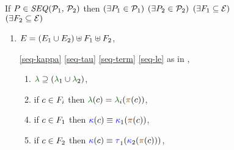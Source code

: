 \begin{figure}
  \renewcommand{\phEvs}{F}
  \raggedright
  
  \noindent
  If $\aPS \in \sSEMI{\aPSS_1}{\aPSS_2}$ then
  $(\exists P_1\in\mathcal{P}_1)$ $(\exists P_2\in\mathcal{P}_2)$
  $(\exists\phEvs_1\subseteq\AllEvents)$ $(\exists\phEvs_2\subseteq\AllEvents)$
  \begin{multicols}{2}
    \begin{enumerate}[topsep=0pt,label=(\textsc{s}\arabic*),ref=\textsc{s}\arabic*]
      \setcounter{enumi}{\value{BE}}
    \item \label{seq-E-phantom}
      $\aEvs=(\aEvs_1\cup\aEvs_2)\uplus\phEvs_1 \uplus\phEvs_2$,

    \item[\eqref{seq-kappa}]
      \eqref{seq-tau}\;
      \eqref{seq-term}\;
      \eqref{seq-le}\;
      as in ,

      \setcounter{enumi}{\value{lambda}}
    \item[] 
      \begin{enumerate}[leftmargin=0pt]
      \item \label{seq-lambda-include}
        ${\labeling}\supseteq\PBR{{\labeling_1}\cup {\labeling_2}}$, 
      \item \label{seq-lambda-phantom}
        if $\cEv\in \phEvs_i$ then $\labeling(\cEv)=\labeling_i(\fmrg{\cEv})$,
      \end{enumerate}

      \setcounter{enumi}{\value{kappa}}
    \item[] 
      \begin{enumerate}[leftmargin=0pt]
        \setcounter{enumii}{3}
      \item \label{seq-kappa-phantom1}
        if $\cEv\in \phEvs_1$ then $\labelingForm(\cEv)\riff\labelingForm_1(\fmrg{\cEv})$,
      \item \label{seq-kappa-phantom2}
        if $\cEv\in \phEvs_2$ then $\labelingForm(\cEv)\riff\aTr[1]{}{\labelingForm_2(\fmrg{\cEv})}$,
      \end{enumerate}


\end{enumerate}
\end{multicols}
\end{figure}

